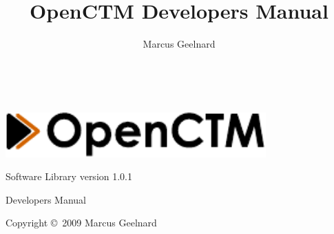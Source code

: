 %
%



\author{Marcus Geelnard}
\title{OpenCTM Developers Manual}





\begin{titlepage}
\begin{center}
~
\vspace{5cm}

\includegraphics[width=10.0cm]{logo.pdf}
\vspace{0.4cm}

{\large Software Library version 1.0.1}

\vspace{1.0cm}

{\Large Developers Manual}
\vspace{1.5cm}

Copyright \copyright \ 2009 Marcus Geelnard
\end{center}
\end{titlepage}



